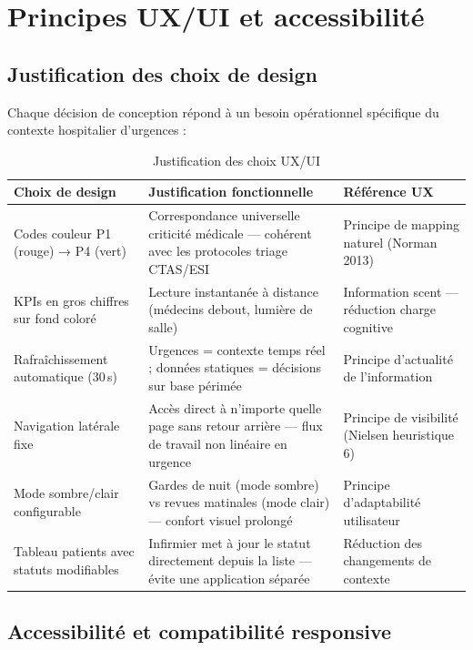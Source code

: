 \documentclass[12pt,a4paper]{report}
\begin{document}
	\section{Principes UX/UI et accessibilité}
	
	\subsection{Justification des choix de design}
	
	Chaque décision de conception répond à un besoin opérationnel spécifique du
	contexte hospitalier d'urgences :
	
	\begin{table}[H]
		\centering
		\caption{Justification des choix UX/UI}
		\renewcommand{\arraystretch}{1.3}
		\begin{tabularx}{\textwidth}{lXX}
			\toprule
			\textbf{Choix de design} & \textbf{Justification fonctionnelle} & \textbf{Référence UX} \\
			\midrule
			Codes couleur P1 (rouge) → P4 (vert)
			& Correspondance universelle criticité médicale — cohérent avec les protocoles triage CTAS/ESI
			& Principe de mapping naturel (Norman 2013) \\
			KPIs en gros chiffres sur fond coloré
			& Lecture instantanée à distance (médecins debout, lumière de salle)
			& Information scent — réduction charge cognitive \\
			Rafraîchissement automatique (30\,s)
			& Urgences = contexte temps réel ; données statiques = décisions sur base périmée
			& Principe d'actualité de l'information \\
			Navigation latérale fixe
			& Accès direct à n'importe quelle page sans retour arrière — flux de travail non linéaire en urgence
			& Principe de visibilité (Nielsen heuristique 6) \\
			Mode sombre/clair configurable
			& Gardes de nuit (mode sombre) vs revues matinales (mode clair) — confort visuel prolongé
			& Principe d'adaptabilité utilisateur \\
			Tableau patients avec statuts modifiables
			& Infirmier met à jour le statut directement depuis la liste — évite une application séparée
			& Réduction des changements de contexte \\
			\bottomrule
		\end{tabularx}
	\end{table}
	
	\subsection{Accessibilité et compatibilité responsive}
	
\end{document}
